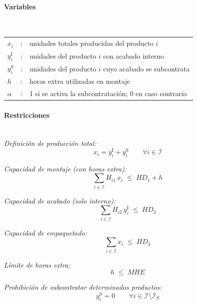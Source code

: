 \paragraph{Variables}\mbox{}\\
\begin{tabular}{lcl}
$x_i$ & : & unidades totales producidas del producto $i$ \\
$y_i^{\mathrm{I}}$ & : & unidades del producto $i$ con acabado interno \\
$y_i^{\mathrm{S}}$ & : & unidades del producto $i$ cuyo acabado se subcontrata \\
$h$ & : & horas extra utilizadas en montaje \\
$\alpha$ & : & 1 si se activa la subcontratación; 0 en caso contrario \\
\end{tabular}

\paragraph{Restricciones}\mbox{}\\

\textit{Definición de producción total:}
\begin{equation}
x_i = y_i^{\mathrm{I}} + y_i^{\mathrm{S}} \qquad \forall i \in \mathcal{I}
\end{equation}

\textit{Capacidad de montaje (con horas extra):}
\begin{equation}
\sum_{i \in \mathcal{I}} H_{i1}\,x_i \;\leq\; HD_1 + h
\end{equation}

\textit{Capacidad de acabado (solo interno):}
\begin{equation}
\sum_{i \in \mathcal{I}} H_{i2}\,y_i^{\mathrm{I}} \;\leq\; HD_2
\end{equation}

\textit{Capacidad de empaquetado:}
\begin{equation}
\sum_{i \in \mathcal{I}} x_i \;\leq\; HD_3
\end{equation}

\textit{Límite de horas extra:}
\begin{equation}
h \;\leq\; MHE
\end{equation}

\textit{Prohibición de subcontratar determinados productos:}
\begin{equation}
y_i^{\mathrm{S}} = 0 \qquad \forall i \in \mathcal{I} \setminus \mathcal{I}_S
\end{equation}

